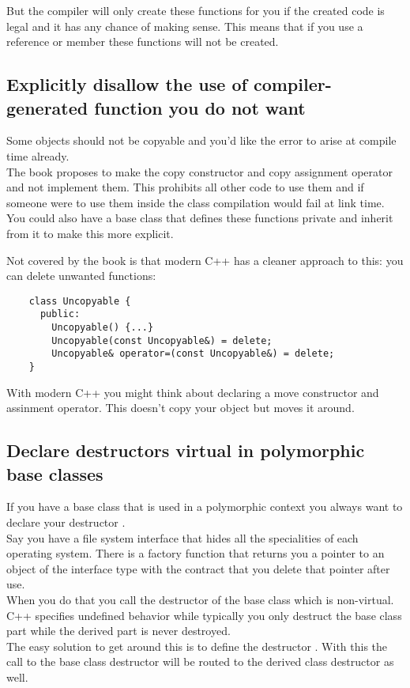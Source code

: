 \documentclass[a4paper, twocolumn]{article}
\let\oldsubsection\subsection
\newcounter{mysubsection}
\renewcommand{\subsection}{
    \stepcounter{mysubsection}
    \oldsubsection
}
\newcommand{\code}[1]{\texttt{\color{black}{#1}}}
\begin{document}
But the compiler will only create these functions for you if the created code is legal and it has any chance of making sense. This means that if you use a reference or \code{const} member these functions will not be created.

\subsection{Explicitly disallow the use of compiler-generated function you do not want}
Some objects should not be copyable and you'd like the error to arise at compile time already.\\
The book proposes to make the copy constructor and copy assignment operator \code{private} and not implement them. This prohibits all other code to use them and if someone were to use them inside the class compilation would fail at link time.\\
You could also have a base class that defines these functions private and inherit from it to make this more explicit.

Not covered by the book is that modern C++ has a cleaner approach to this: you can delete unwanted functions:
\begin{verbatim}
	class Uncopyable {
	  public:
		Uncopyable() {...}
		Uncopyable(const Uncopyable&) = delete;
		Uncopyable& operator=(const Uncopyable&) = delete;
	}
\end{verbatim}
With modern C++ you might think about declaring a move constructor and assinment operator. This doesn't copy your object but moves it around.

\subsection{Declare destructors virtual in polymorphic base classes}
If you have a base class that is used in a polymorphic context you always want to declare your destructor \code{virtual}.\\
Say you have a file system interface that hides all the specialities of each operating system. There is a factory function that returns you a pointer to an object of the interface type with the contract that you delete that pointer after use.\\
When you do that you call the destructor of the base class which is non-virtual. C++ specifies undefined behavior while typically you only destruct the base class part while the derived part is never destroyed.\\
The easy solution to get around this is to define the destructor \code{virtual}. With this the call to the base class destructor will be routed to the derived class destructor as well.
\end{document}
